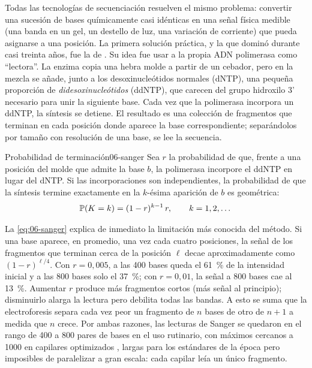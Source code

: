 Todas las tecnologías de secuenciación resuelven el mismo problema: convertir una sucesión de bases químicamente casi idénticas en una señal física medible (una banda en un gel, un destello de luz, una variación de corriente) que pueda asignarse a una posición. La primera solución práctica, y la que dominó durante casi treinta años, fue la de \textcite{c06-sanger1977}. Su idea fue usar a la propia ADN polimerasa como ``lectora''. La enzima copia una hebra molde a partir de un cebador, pero en la mezcla se añade, junto a los desoxinucleótidos normales (dNTP), una pequeña proporción de \emph{didesoxinucleótidos} (ddNTP), que carecen del grupo hidroxilo 3' necesario para unir la siguiente base. Cada vez que la polimerasa incorpora un ddNTP, la síntesis se detiene. El resultado es una colección de fragmentos que terminan en cada posición donde aparece la base correspondiente; separándolos por tamaño con resolución de una base, se lee la secuencia.

\begin{definicion}{Probabilidad de terminación}{06-sanger}
Sea $r$ la probabilidad de que, frente a una posición del molde que admite la base $b$, la polimerasa incorpore el ddNTP en lugar del dNTP. Si las incorporaciones son independientes, la probabilidad de que la síntesis termine exactamente en la $k$-ésima aparición de $b$ es geométrica:
\begin{equation}\label{eq:06-sanger}
\mathbb{P}(K=k) = (1-r)^{k-1}\,r,\qquad k=1,2,\dots
\end{equation}
\end{definicion}

\begin{simbolos}
\end{simbolos}

La \cref{eq:06-sanger} explica de inmediato la limitación más conocida del método. Si una base aparece, en promedio, una vez cada cuatro posiciones, la señal de los fragmentos que terminan cerca de la posición $\ell$ decae aproximadamente como $(1-r)^{\ell/4}$. Con $r=0{,}005$, a las 400 bases queda el \SI{61}{\percent} de la intensidad inicial y a las 800 bases solo el \SI{37}{\percent}; con $r=0{,}01$, la señal a 800 bases cae al \SI{13}{\percent}. Aumentar $r$ produce más fragmentos cortos (más señal al principio); disminuirlo alarga la lectura pero debilita todas las bandas. A esto se suma que la electroforesis separa cada vez peor un fragmento de $n$ bases de otro de $n+1$ a medida que $n$ crece. Por ambas razones, las lecturas de Sanger se quedaron en el rango de 400 a 800 pares de bases en el uso rutinario, con máximos cercanos a \num{1000} en capilares optimizados \parencite{c06-bentley2008}, largas para los estándares de la época pero imposibles de paralelizar a gran escala: cada capilar leía un único fragmento.

